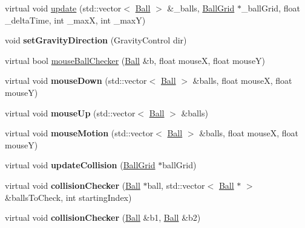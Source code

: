 \begin{DoxyCompactItemize}
\item 
virtual void \hyperlink{classBallControl_af32a9b232b26af69231966ae3aab98d5}{update} (std::vector$<$ \hyperlink{structBall}{Ball} $>$ \&\_\-balls, \hyperlink{classBallGrid}{BallGrid} $\ast$\_\-ballGrid, float \_\-deltaTime, int \_\-maxX, int \_\-maxY)
\item 
\hypertarget{classBallControl_afa0b3f2735a09bd485ff70ce76ba0ec4}{
void {\bfseries setGravityDirection} (GravityControl dir)}
\label{classBallControl_afa0b3f2735a09bd485ff70ce76ba0ec4}

\item 
virtual bool \hyperlink{classBallControl_a4f811993f5e8988eb4f4ab3c03dadf52}{mouseBallChecker} (\hyperlink{structBall}{Ball} \&b, float mouseX, float mouseY)
\item 
\hypertarget{classBallControl_abec61f04e0f597dcda76ff75ba86e5b8}{
virtual void {\bfseries mouseDown} (std::vector$<$ \hyperlink{structBall}{Ball} $>$ \&balls, float mouseX, float mouseY)}
\label{classBallControl_abec61f04e0f597dcda76ff75ba86e5b8}

\item 
\hypertarget{classBallControl_a3e7166e0945803af4880498eba1f559e}{
virtual void {\bfseries mouseUp} (std::vector$<$ \hyperlink{structBall}{Ball} $>$ \&balls)}
\label{classBallControl_a3e7166e0945803af4880498eba1f559e}

\item 
\hypertarget{classBallControl_a316583a199b92d1f737910c08c550900}{
virtual void {\bfseries mouseMotion} (std::vector$<$ \hyperlink{structBall}{Ball} $>$ \&balls, float mouseX, float mouseY)}
\label{classBallControl_a316583a199b92d1f737910c08c550900}

\item 
\hypertarget{classBallControl_ab5cc0c3b41404bba171ef3f447043875}{
virtual void {\bfseries updateCollision} (\hyperlink{classBallGrid}{BallGrid} $\ast$ballGrid)}
\label{classBallControl_ab5cc0c3b41404bba171ef3f447043875}

\item 
\hypertarget{classBallControl_a33543f2a175094819e5a3d8631eb34af}{
virtual void {\bfseries collisionChecker} (\hyperlink{structBall}{Ball} $\ast$ball, std::vector$<$ \hyperlink{structBall}{Ball} $\ast$ $>$ \&ballsToCheck, int startingIndex)}
\label{classBallControl_a33543f2a175094819e5a3d8631eb34af}

\item 
\hypertarget{classBallControl_ad12ad637d1dc8239634397c445929698}{
virtual void {\bfseries collisionChecker} (\hyperlink{structBall}{Ball} \&b1, \hyperlink{structBall}{Ball} \&b2)}
\label{classBallControl_ad12ad637d1dc8239634397c445929698}


\end{DoxyCompactItemize}
